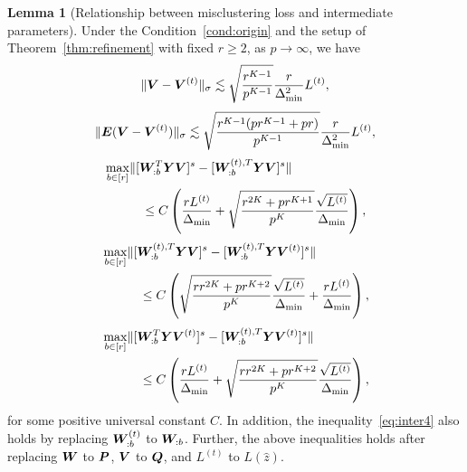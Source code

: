 \documentclass[journal]{IEEEtran}
\theoremstyle{definition}
\newtheorem{lem}{Lemma}
\theoremstyle{definition}
\newcommand{\of}[1]{\left(#1\right)}
\begin{document}
     \begin{lem}[Relationship between misclustering loss and intermediate parameters]\label{lem:intermediate} Under the Condition~\ref{cond:origin} and the setup of Theorem~\ref{thm:refinement} {with fixed $r \geq 2$, as $p \rightarrow \infty$}, we have
     \small
    \begin{equation}\label{eq:inter1}
        \onormSize{}{\mV - \mV^{(t)}}_{\sigma} \lesssim \sqrt{\frac{r^{K-1}}{p^{K-1}}}  \frac{r}{\Delta_{\min}^2} L^{(t)},
    \end{equation}
    \begin{equation}\label{eq:inter2}
        \onormSize{}{\mE (\mV - \mV^{(t)})}_{\sigma} \lesssim \sqrt{ \frac{r^{K-1}(p r^{K-1} + p r)}{p^{K-1}}} 
 \frac{r}{\Delta_{\min}^2} L^{(t)},
 \end{equation}
 \begin{align}
     &\max_{b \in [r]} \onormSize{}{ [ \mW_{:b}^T \mY \mV ]^s   -  [ \mW_{:b}^{(t), T} \mY \mV  ]^s } \\
     & \quad \quad \quad \leq C \of{\frac{r L^{(t)}}{\Delta_{\min}} + \sqrt{ \frac{r^{2K} + pr^{K+1}}{p^{K}} } \frac{\sqrt{L^{(t)}}}{\Delta_{\min}}}, \label{eq:inter3}
 \end{align}
 \begin{align}
     &\max_{b \in [r]} \onormSize{}{  [  \mW_{:b}^{(t), T}  \mY \mV]^s - [  \mW_{:b}^{(t), T}  \mY \mV^{(t)}]^s } \\
      &\quad \quad \quad  \leq C  \of{ \sqrt{ \frac{rr^{2K} + p r^{K+2}}{p^{K}}}  \frac{\sqrt{L^{(t)}}}{\Delta_{\min}} +  \frac{r L^{(t)}}{\Delta_{\min}}}, \label{eq:inter4}
 \end{align}
 \begin{align}
     & \max_{b \in [r]} \onormSize{}{ [\mW_{:b}^T \mY \mV^{(t)} ]^s   -  [ \mW_{:b}^{(t), T} \mY \mV^{(t)} ]^s }\\
     &\quad \quad \quad  \leq C \of{\frac{rL^{(t)}}{\Delta_{\min}} + \sqrt{ \frac{rr^{2K} + p r^{K+2}}{p^{K}}}  \frac{\sqrt{L^{(t)}}}{\Delta_{\min}}}, \label{eq:inter5}
 \end{align}
 \normalsize
    for some positive universal constant $C$. In addition, the inequality~\eqref{eq:inter4} also holds by replacing $\bm{W}_{:b}^{(t)}$ to $\bm{W}_{:b}$. Further, the above inequalities holds after replacing $\bm{W}$ to $\bm{P}$, $\bm{V}$ to $\bm{Q}$, and $L^{(t)}$ to $L(\hat z)$.
    \end{lem}
\end{document}
